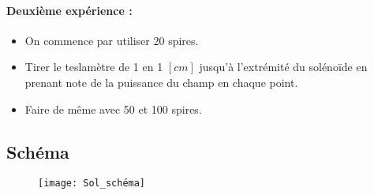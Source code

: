 \paragraph{Deuxième expérience :}
\begin{itemize}
    \item On commence par utiliser 20 spires.
    \item Tirer le teslamètre de 1 en 1 $[cm]$ jusqu'à l'extrémité du solénoïde en prenant note de la puissance du champ en chaque point.
    \item Faire de même avec 50 et 100 spires.\\
\end{itemize}

\subsection{Schéma}

\begin{figure}[H]
  \centering
    \texttt{[image: Sol\_schéma]}
\end{figure}